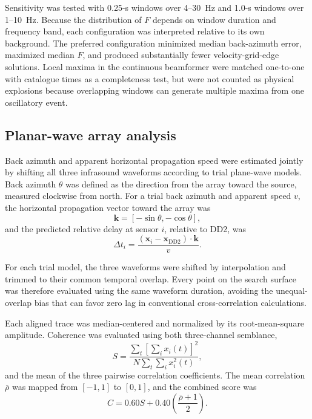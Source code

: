 \documentclass[]{seismica}
\begin{document}
Sensitivity was tested with 0.25-s windows over 4--30~Hz and 1.0-s windows
over 1--10~Hz. Because the distribution of $F$ depends on window duration and
frequency band, each configuration was interpreted relative to its own
background. The preferred configuration minimized median back-azimuth error,
maximized median $F$, and produced substantially fewer velocity-grid-edge
solutions. Local maxima in the continuous beamformer were matched one-to-one
with catalogue times as a completeness test, but were not counted as physical
explosions because overlapping windows can generate multiple maxima from one
oscillatory event.

\subsection{Planar-wave array analysis}

Back azimuth and apparent horizontal propagation speed were estimated jointly by shifting all three infrasound waveforms according to trial plane-wave models. Back azimuth $\theta$ was defined as the direction from the array toward the source, measured clockwise from north. For a trial back azimuth and apparent speed $v$, the horizontal propagation vector toward the array was
\begin{equation}
  \mathbf{k} = [-\sin\theta,-\cos\theta],
  \label{eq:propagation_vector}
\end{equation}
and the predicted relative delay at sensor $i$, relative to DD2, was
\begin{equation}
  \Delta t_i = \frac{(\mathbf{x}_i-\mathbf{x}_{\mathrm{DD2}})\cdot\mathbf{k}}{v}.
  \label{eq:plane_delay}
\end{equation}

For each trial model, the three waveforms were shifted by interpolation and trimmed to their common temporal overlap. Every point on the search surface was therefore evaluated using the same waveform duration, avoiding the unequal-overlap bias that can favor zero lag in conventional cross-correlation calculations.

Each aligned trace was median-centered and normalized by its root-mean-square amplitude. Coherence was evaluated using both three-channel semblance,
\begin{equation}
  S = \frac{\sum_t\left[\sum_i x_i(t)\right]^2}{N\sum_t\sum_i x_i^2(t)},
  \label{eq:semblance}
\end{equation}
and the mean of the three pairwise correlation coefficients. The mean correlation $\overline{\rho}$ was mapped from $[-1,1]$ to $[0,1]$, and the combined score was
\begin{equation}
  C = 0.60S + 0.40\left(\frac{\overline{\rho}+1}{2}\right).
  \label{eq:coherence_score}
\end{equation}
\end{document}
